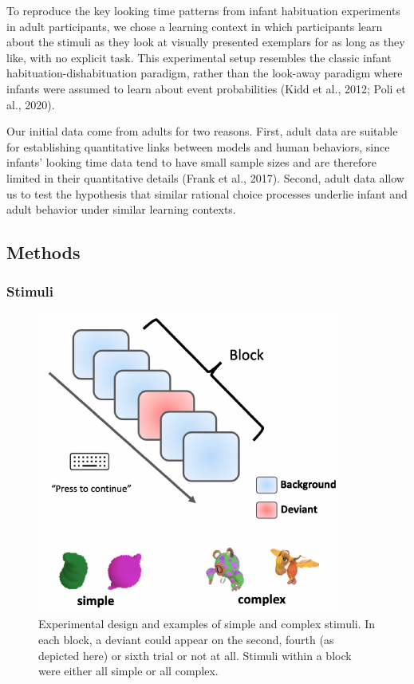 \documentclass[10pt, letterpaper]{article}
\newenvironment{CodeChunk}{}{}
\begin{document}
To reproduce the key looking time patterns from infant habituation
experiments in adult participants, we chose a learning context in which
participants learn about the stimuli as they look at visually presented
exemplars for as long as they like, with no explicit task. This
experimental setup resembles the classic infant
habituation-dishabituation paradigm, rather than the look-away paradigm
where infants were assumed to learn about event probabilities (Kidd et
al., 2012; Poli et al., 2020).

Our initial data come from adults for two reasons. First, adult data are
suitable for establishing quantitative links between models and human
behaviors, since infants' looking time data tend to have small sample
sizes and are therefore limited in their quantitative details (Frank et
al., 2017). Second, adult data allow us to test the hypothesis that
similar rational choice processes underlie infant and adult behavior
under similar learning contexts.

\hypertarget{methods}{%
\subsection{Methods}\label{methods}}

\hypertarget{stimuli}{%
\subsubsection{Stimuli}\label{stimuli}}

\begin{CodeChunk}
\begin{figure}[h]

{\centering \includegraphics{figs/experimental_design-1} 

}

\caption[Experimental design and examples of simple and complex stimuli]{Experimental design and examples of simple and complex stimuli. In each block, a deviant could appear on the second, fourth (as depicted here) or sixth trial or not at all. Stimuli within a block were either all simple or all complex.}\label{fig:experimental_design}
\end{figure}
\end{CodeChunk}
\end{document}
